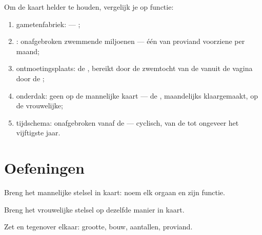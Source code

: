 \begin{method}\label{met:g8:reproductive-systems:sides}
Om de kaart helder te houden, vergelijk je op functie:
\begin{enumerate}
  \item gametenfabriek:  --- ;
  \item {}: onafgebroken zwemmende miljoenen --- één van proviand
        voorziene  per maand;
  \item ontmoetingsplaats: de , bereikt door de zwemtocht van de
         vanuit de vagina door de ;
  \item onderdak: geen op de mannelijke kaart --- de , maandelijks
        klaargemaakt, op de vrouwelijke;
  \item tijdschema: onafgebroken vanaf de  --- cyclisch, van de
         tot ongeveer het vijftigste jaar.
\end{enumerate}
\end{method}

\section{Oefeningen}

\begin{exercise}[$\star$]\label{exo:g8:reproductive-systems:1}
Breng het mannelijke stelsel in kaart: noem elk orgaan en zijn functie.
\end{exercise}

\begin{exercise}[$\star$]\label{exo:g8:reproductive-systems:2}
Breng het vrouwelijke stelsel op dezelfde manier in kaart.
\end{exercise}

\begin{exercise}[$\star$]\label{exo:g8:reproductive-systems:3}
Zet  en  tegenover elkaar: grootte, bouw, aantallen,
proviand.
\end{exercise}

